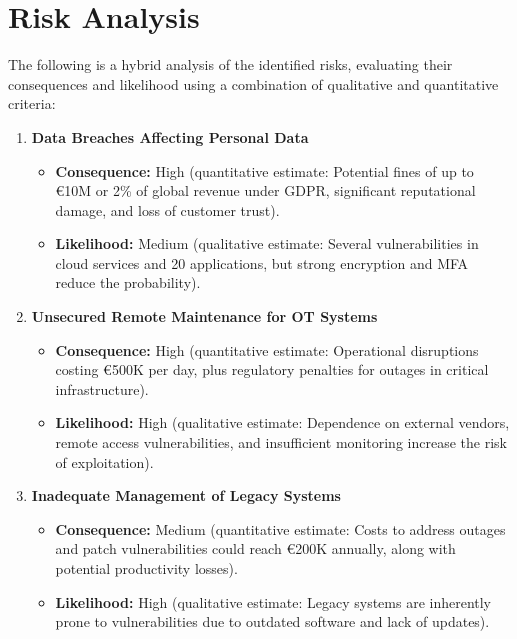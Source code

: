 \section{Risk Analysis}

The following is a hybrid analysis of the identified risks, evaluating their consequences and likelihood using a combination of qualitative and quantitative criteria:

\begin{enumerate}
    \item \textbf{Data Breaches Affecting Personal Data}
    \begin{itemize}
        \item \textbf{Consequence:} High (quantitative estimate: Potential fines of up to €10M or 2\% of global revenue under GDPR, significant reputational damage, and loss of customer trust).
        \item \textbf{Likelihood:} Medium (qualitative estimate: Several vulnerabilities in cloud services and 20 applications, but strong encryption and MFA reduce the probability).
    \end{itemize}

    \item \textbf{Unsecured Remote Maintenance for OT Systems}
    \begin{itemize}
        \item \textbf{Consequence:} High (quantitative estimate: Operational disruptions costing €500K per day, plus regulatory penalties for outages in critical infrastructure).
        \item \textbf{Likelihood:} High (qualitative estimate: Dependence on external vendors, remote access vulnerabilities, and insufficient monitoring increase the risk of exploitation).
    \end{itemize}

    \item \textbf{Inadequate Management of Legacy Systems}
    \begin{itemize}
        \item \textbf{Consequence:} Medium (quantitative estimate: Costs to address outages and patch vulnerabilities could reach €200K annually, along with potential productivity losses).
        \item \textbf{Likelihood:} High (qualitative estimate: Legacy systems are inherently prone to vulnerabilities due to outdated software and lack of updates).
    \end{itemize}


\end{enumerate}
